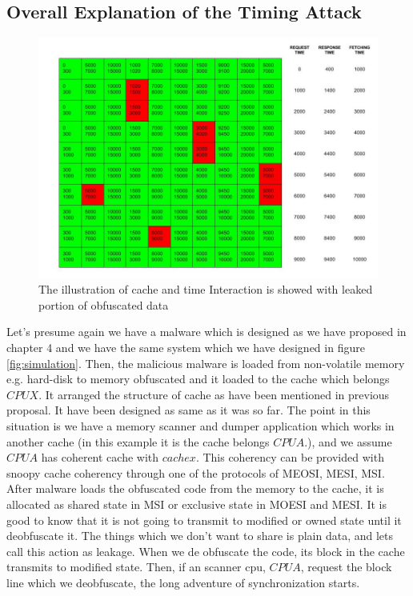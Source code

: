 \subsection{Overall Explanation of the Timing Attack}
\begin{figure}[h!]
    \centering
    \includegraphics[width=1\textwidth]{img/overall_timing_attack.jpg}
    \caption{The illustration of cache and time Interaction is showed with leaked portion of obfuscated data}
    \label{fig:overall}
	\end{figure}
	Let's presume again we have a malware which is designed as we have proposed in chapter 4 and we have the same system which we have designed in figure \ref{fig:simulation}. Then, the malicious malware is loaded from non-volatile memory e.g. hard-disk to memory obfuscated and it loaded to the cache which belongs $CPUX$. It arranged the structure of cache as have been mentioned in previous proposal. It have been designed as same as it was so far. The point in this situation is we have a memory scanner and dumper application which works in another cache (in this example it is the cache belongs $CPUA$.), and we assume $CPUA$ has coherent cache with $cache x$. This coherency can be provided with snoopy cache coherency through one of the protocols of MEOSI, MESI, MSI. After malware loads the obfuscated code from the memory to the cache, it is allocated as shared state in MSI or exclusive state in MOESI and MESI. It is good to know that it is not going to transmit to modified or owned state until it deobfuscate it. The things which we don't want to share is plain data, and lets call this action as leakage. When we de obfuscate the code, its block in the cache transmits to modified state. Then, if an scanner cpu, $CPUA$, request the block line which we deobfuscate, the long adventure of synchronization starts.

